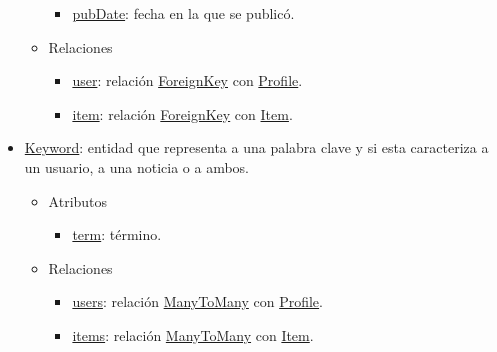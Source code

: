 \begin{itemize}
\begin{itemize}
\begin{itemize}
            \item \underline{pubDate}: fecha en la que se publicó.
        \end{itemize}
        \item Relaciones
        \begin{itemize}
            \item \underline{user}: relación \underline{ForeignKey} con \underline{Profile}.
            \item \underline{item}: relación \underline{ForeignKey} con \underline{Item}.
        \end{itemize}
    \end{itemize}
    \item \underline{Keyword}: entidad que representa a una palabra clave y si esta caracteriza a un usuario, a una noticia o a ambos.
    \begin{itemize}
        \item Atributos
        \begin{itemize}
            \item \underline{term}: término.
        \end{itemize}
        \item Relaciones
        \begin{itemize}
            \item \underline{users}: relación \underline{ManyToMany} con \underline{Profile}.
            \item \underline{items}: relación \underline{ManyToMany} con \underline{Item}.
        \end{itemize}
    \end{itemize}
\end{itemize}